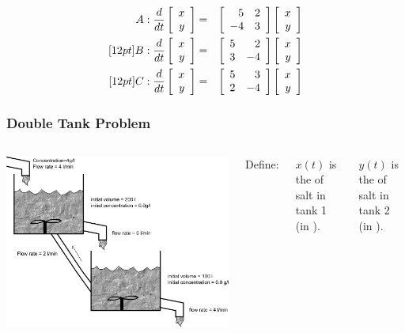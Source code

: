 {\begin{frame}
{        \begin{eqnarray*}
          A: \frac{d}{dt} \left[ \begin{array}{r} x \\ y \end{array} \right] & = & \left[ \begin{array}{rr} 5 & 2 \\ -4 & 3 \end{array} \right] \left[ \begin{array}{r} x \\ y \end{array} \right] \\ [12pt]
          B: \frac{d}{dt} \left[ \begin{array}{r} x \\ y \end{array} \right] & = & \left[ \begin{array}{rr} 5 & 2 \\ 3 & -4 \end{array} \right] \left[ \begin{array}{r} x \\ y \end{array} \right] \\ [12pt]
          C: \frac{d}{dt} \left[ \begin{array}{r} x \\ y \end{array} \right] & = & \left[ \begin{array}{rr} 5 & 3 \\ 2 & -4 \end{array} \right] \left[ \begin{array}{r} x \\ y \end{array} \right] 
        \end{eqnarray*}

          \vfill

     }\fi

    \vfill
    \vfill
    \vfill

\end{frame}

}


\begin{frame}
  \frametitle{Double Tank Problem}

  \begin{columns}
    {\includegraphics[width=1.5\textwidth]{img/introLinearAlgebraTankProblem}}    


    Define:

    $x(t)$ is the  of salt in tank 1 (in ).

    $y(t)$ is the  of salt in tank 2 (in ).
    \vspace{3cm}
  \end{columns}
\end{frame}

